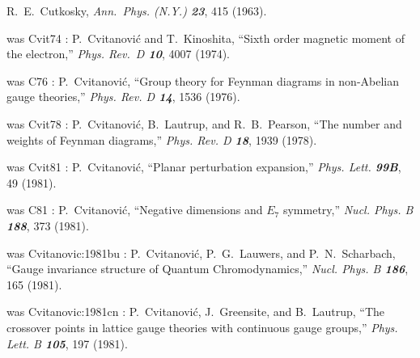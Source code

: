 
R.~E.~Cutkosky,
{\em Ann.~Phys. (N.Y.)  \bf 23}, 415 (1963).

was Cvit74 :
 P.~Cvitanovi\'c and T.~Kinoshita,
    ``Sixth order magnetic moment of the electron,''
    {\em Phys. Rev.~D \bf 10}, 4007 (1974).

was C76 :
 P.~Cvitanovi\'c,
``Group theory for Feynman diagrams in non-Abelian gauge theories,''
    {\em Phys. Rev.  D \bf 14}, 1536 (1976).

%

was Cvit78 :
 P.~Cvitanovi\'c, B.~Lautrup, and R.~B.~Pearson,
    ``The number and weights of Feynman diagrams,''
    {\em Phys. Rev. D \bf 18}, 1939 (1978).

was Cvit81 :
 P.~Cvitanovi\'c,
    ``Planar perturbation expansion,''
    {\em Phys. Lett. \bf 99B}, 49 (1981).

was C81 :
  P.~Cvitanovi\'c,
    ``Negative dimensions and $E_7$ symmetry,''
    {\em Nucl. Phys. B \bf 188}, 373 (1981).

was Cvitanovic:1981bu :
 P.~Cvitanovi\'c, P.~G.~Lauwers, and P.~N.~Scharbach,
    ``Gauge invariance structure of Quantum Chromodynamics,''
    {\em Nucl.  Phys.  B \bf 186}, 165 (1981).

was Cvitanovic:1981cn :
 P.~Cvitanovi\'c, J.~Greensite, and B.~Lautrup,
    ``The crossover points in lattice gauge theories with
    continuous gauge groups,''
    {\em Phys.  Lett.  B \bf 105}, 197 (1981).


